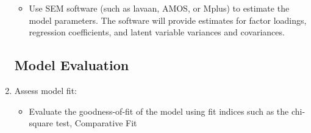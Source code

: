 \documentclass[
]{article}
\providecommand{\tightlist}{%
  \setlength{\itemsep}{0pt}\setlength{\parskip}{0pt}}
\begin{document}
\begin{enumerate}
  \begin{itemize}
  \tightlist
  \item
    Use SEM software (such as lavaan, AMOS, or Mplus) to estimate the
    model parameters. The software will provide estimates for factor
    loadings, regression coefficients, and latent variable variances and
    covariances.
  \end{itemize}

  \hypertarget{model-evaluation}{%
  \subsection{Model Evaluation}\label{model-evaluation}}
\item
  Assess model fit:

  \begin{itemize}
  \tightlist
  \item
    Evaluate the goodness-of-fit of the model using fit indices such as
    the chi-square test, Comparative Fit
  \end{itemize}
\end{enumerate}
\end{document}
